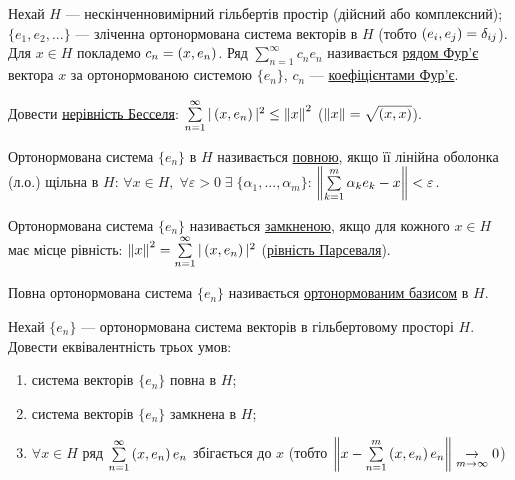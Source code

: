 
\begin{theory}
    Нехай $H$ --- нескінченновимірний гільбертів простір (дійсний або комплексний); 
    $\{e_1, e_2, ...\}$ --- зліченна ортонормована система векторів в $H$ (тобто $\left(e_i, e_j\right) 
    = \delta_{ij}$). Для $x \in H$ покладемо $c_n = \left(x, e_n\right)$. Ряд $\sum\limits_{n=1}^\infty 
    c_n e_n$ називається \underline{рядом Фур'є} вектора $x$ за ортонормованою системою 
    $\{e_n\}$, $c_n$ --- \underline{коефіцієнтами Фур'є}.
\end{theory}

\begin{exercise}
    Довести \underline{нерівність Бесселя}: $\sum\limits_{n=1}^\infty |\left(x, e_n\right)|^2 \leq 
    \left\lVert x\right\rVert^2$ ($\left\lVert x\right\rVert = \sqrt{\left(x, x\right)}$).
\end{exercise}

\begin{theory}
    
    Ортонормована система $\{e_n\}$ в $H$ називається \underline{повною}, якщо її лінійна 
    оболонка (л.о.) щільна в $H$:
     $\forall x \in H, \;\forall \varepsilon > 0 \; \exists \; \{\alpha_1, ..., 
    \alpha_m\}$: $\left\lVert\sum\limits_{k=1}^m \alpha_k e_k - x\right\rVert < \varepsilon$.

    Ортонормована система $\{e_n\}$ називається \underline{замкненою}, якщо для кожного 
    $x \in H$ має місце рівність: $\left\lVert x\right\rVert^2 = \sum\limits_{n=1}^\infty |\left(x, e_n\right)|^2$ 
    (\underline{рівність Парсеваля}).

    Повна ортонормована система $\{e_n\}$ називається \uline{ортонормованим 
    базисом} в $H$.
\end{theory}

\begin{exercise}
    Нехай $\{e_n\}$ --- ортонормована система векторів в гільбертовому просторі $H$. 
    Довести еквівалентність трьох умов:
    \begin{enumerate}[label=\ukr*)]
        \item система векторів $\{e_n\}$ повна в $H$;
        \item система векторів $\{e_n\}$ замкнена в $H$;
        \item $\forall x \in H$ ряд $\sum\limits_{n=1}^\infty \left(x, e_n\right)e_n$ збігається до $x$
        (тобто $\left\lVert x - \sum\limits_{n=1}^m \left(x, e_n\right)e_n\right\rVert
        \underset{m\rightarrow\infty}{\rightarrow}0$)
    \end{enumerate}
\end{exercise}

